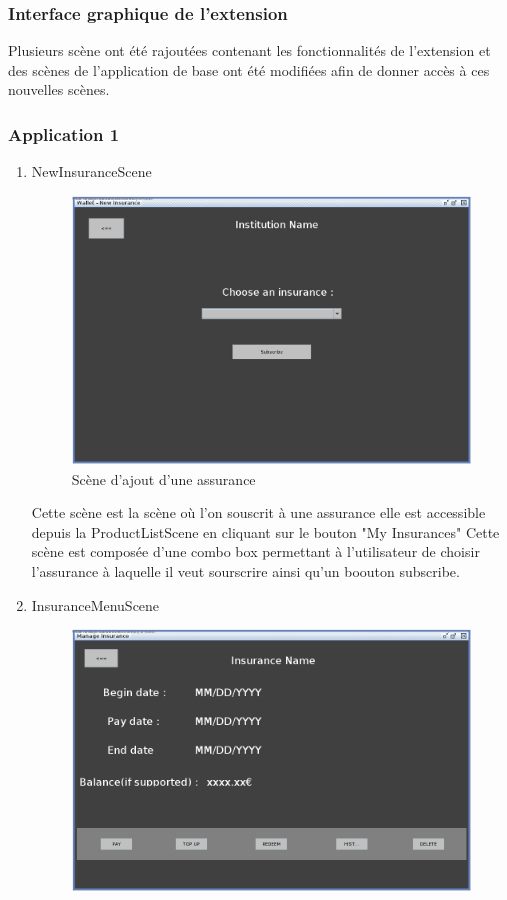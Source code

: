 \documentclass[../rapport.tex]{subfiles}
\begin{document}
		\subsubsection{Interface graphique de l'extension}

		Plusieurs scène ont été rajoutées contenant les fonctionnalités de l'extension et des scènes de l'application de base ont été modifiées afin de donner accès à ces nouvelles scènes. 
		\subsubsection{Application 1}
		\newpage
		\begin{enumerate}
				\item{NewInsuranceScene} \\
						\begin{figure}[h!]
								\centering\includegraphics[scale=0.3]{ressources/photos_diagrammes/extensionThomas/gui1/addInsurance.jpg}
								\caption{Scène d'ajout d'une assurance}
						\end{figure} 
						Cette scène est la scène où l'on souscrit à une assurance elle est accessible depuis la ProductListScene en cliquant
						sur le bouton "My Insurances" Cette scène est composée d'une combo box permettant à l'utilisateur de choisir l'assurance
						à laquelle il veut sourscrire ainsi qu'un boouton subscribe.
				\newpage
				\item{InsuranceMenuScene} 
						\begin{figure}[h!]
								\centering\includegraphics[scale=0.3]{ressources/photos_diagrammes/extensionThomas/gui1/insuranceMenu.jpg}

\end{figure}
\end{enumerate}
\end{document}
